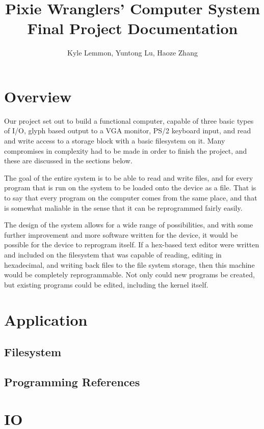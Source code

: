 \documentclass[11pt]{article}
\title{\textbf{Pixie Wranglers' Computer System Final Project Documentation}}
\author{Kyle Lemmon, Yuntong Lu, Haoze Zhang}
\date{}
\begin{document}
\maketitle

\tableofcontents

\section{Overview}
Our project set out to build a functional computer, capable of three basic types of I/O, glyph based output to a VGA monitor, PS/2 keyboard input, and read and write access to a storage block with a basic filesystem on it. Many compromises in complexity had to be made in order to finish the project, and these are discussed in the sections below.

The goal of the entire system is to be able to read and write files, and for every program that is run on the system to be loaded onto the device as a file. That is to say that every program on the computer comes from the same place, and that is somewhat maliable in the sense that it can be reprogrammed fairly easily.

The design of the system allows for a wide range of possibilities, and with some further improvement and more software written for the device, it would be possible for the device to reprogram itself. If a hex-based text editor were written and included on the filesystem that was capable of reading, editing in hexadecimal, and writing back files to the file system storage, then this machine would be completely reprogrammable. Not only could new programs be created, but existing programs could be edited, including the kernel itself.


\section{Application}

\subsection{Filesystem}

\subsection{Programming References}

\section{IO}
\end{document}
